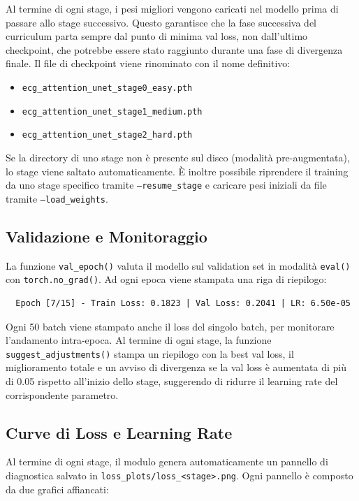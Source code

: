 Al termine di ogni stage, i pesi migliori vengono caricati nel modello prima di passare allo stage successivo. Questo garantisce che la fase successiva del curriculum parta sempre dal punto di minima val loss, non dall'ultimo checkpoint, che potrebbe essere stato raggiunto durante una fase di divergenza finale. Il file di checkpoint viene rinominato con il nome definitivo:

\begin{itemize}
    \item \texttt{ecg\_attention\_unet\_stage0\_easy.pth}
    \item \texttt{ecg\_attention\_unet\_stage1\_medium.pth}
    \item \texttt{ecg\_attention\_unet\_stage2\_hard.pth}
\end{itemize}

Se la directory di uno stage non è presente sul disco (modalità pre-augmentata), lo stage viene saltato automaticamente. È inoltre possibile riprendere il training da uno stage specifico tramite \texttt{--resume\_stage} e caricare pesi iniziali da file tramite \texttt{--load\_weights}.

\subsection{Validazione e Monitoraggio}

La funzione \texttt{val\_epoch()} valuta il modello sul validation set in modalità \texttt{eval()} con \texttt{torch.no\_grad()}. Ad ogni epoca viene stampata una riga di riepilogo:

\begin{verbatim}
  Epoch [7/15] - Train Loss: 0.1823 | Val Loss: 0.2041 | LR: 6.50e-05
\end{verbatim}

Ogni 50 batch viene stampato anche il loss del singolo batch, per monitorare l'andamento intra-epoca. Al termine di ogni stage, la funzione \texttt{suggest\_adjustments()} stampa un riepilogo con la best val loss, il miglioramento totale e un avviso di divergenza se la val loss è aumentata di più di 0.05 rispetto all'inizio dello stage, suggerendo di ridurre il learning rate del corrispondente parametro.

\subsection{Curve di Loss e Learning Rate}

Al termine di ogni stage, il modulo genera automaticamente un pannello di diagnostica salvato in \texttt{loss\_plots/loss\_<stage>.png}. Ogni pannello è composto da due grafici affiancati:


